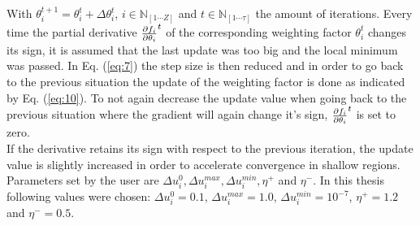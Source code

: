 With $\theta_i^{t+1} = \theta_i^{t} + \Delta \theta^t_i$, $i \in \mathbb{N}_{[1\cdots Z]}$ and $t \in \mathbb{N}_{[1 \cdots \mathbb{\tau}]}$ the amount of iterations. Every time the partial derivative $\pdv{f_i}{\theta_i}^t$ of the corresponding weighting factor $\theta_i^t$ changes its sign, it is assumed that the last update was too big and the local minimum was passed. In Eq. (\ref{eq:7}) the step size is then reduced and in order to go back to the previous situation the update of the weighting factor is done as indicated by Eq. (\ref{eq:10}). To not again decrease the update value when going back to the previous situation where the gradient will again change it's sign,  $\pdv{f_i}{\theta_i}^{t}$ is set to zero.\\
If the derivative retains its sign with respect to the previous iteration, the update value is slightly increased in order to accelerate convergence in shallow regions. \cite{RPROP} Parameters set by the user are $\Delta u^0_i,\Delta u^{max}_i,\Delta u^{min}_i, \eta^+$ and $\eta^-$. In this thesis following values were chosen: $\Delta u^0_i = 0.1$, $\Delta u^{max}_i=1.0$, $\Delta u^{min}_i=10^{-7}$, $\eta^+ = 1.2$ and $\eta^- = 0.5$.

%




